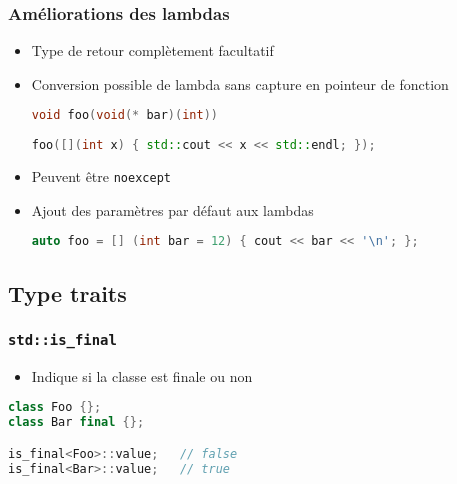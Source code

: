 \documentclass[C++.tex]{subfiles}
\begin{document}
\begin{frame}[fragile]
	\frametitle{Améliorations des lambdas}
	\begin{itemize}
		\item Type de retour complètement facultatif


		\item Conversion possible de lambda sans capture en pointeur de fonction


\begin{lstlisting}[language=C++]
void foo(void(* bar)(int))
		
foo([](int x) { std::cout << x << std::endl; });\end{lstlisting}

		\item Peuvent être \lstinline|noexcept|
		\item Ajout des paramètres par défaut aux lambdas
	
		\begin{lstlisting}[language=C++]
auto foo = [] (int bar = 12) { cout << bar << '\n'; };\end{lstlisting}
	\end{itemize}
\end{frame}

\subsection*{Type traits}
\begin{frame}[fragile]
	\frametitle{\lstinline|std::is_final|}
	\begin{itemize}
		\item Indique si la classe est finale ou non
	\end{itemize}

	\begin{lstlisting}[language=C++]
class Foo {};
class Bar final {};

is_final<Foo>::value;   // false
is_final<Bar>::value;   // true\end{lstlisting}
\end{frame}
\end{document}
